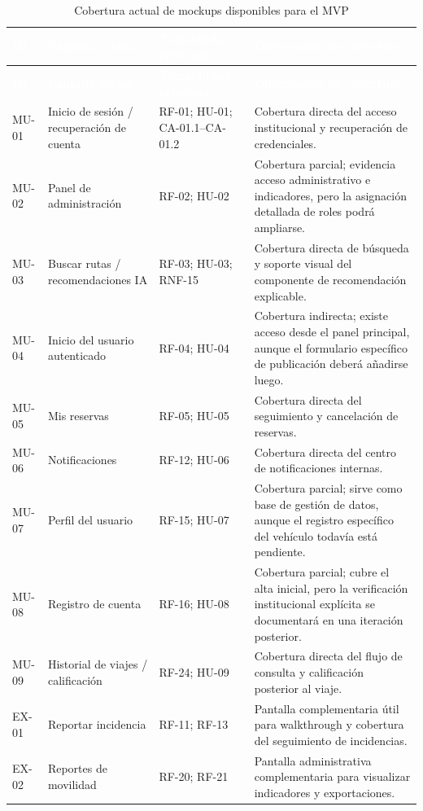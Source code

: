 \documentclass[12pt,a4paper]{article}
\begin{document}
\begin{longtable}{C{1.35cm} L{4.25cm} L{2.45cm} L{5.25cm}}
\caption{Cobertura actual de mockups disponibles para el MVP}\label{tab:cobertura-mockups-actual}\\
\textcolor{white}{\textbf{ID}} &
\textcolor{white}{\textbf{Pantalla actual}} &
\textcolor{white}{\textbf{Trazabilidad principal}} &
\textcolor{white}{\textbf{Observación de cobertura}}\\
\endfirsthead
{}
\textcolor{white}{\textbf{ID}} &
\textcolor{white}{\textbf{Pantalla actual}} &
\textcolor{white}{\textbf{Trazabilidad principal}} &
\textcolor{white}{\textbf{Observación de cobertura}}\\
\endhead
MU-01 & Inicio de sesión / recuperación de cuenta & RF-01; HU-01; CA-01.1--CA-01.2 & Cobertura directa del acceso institucional y recuperación de credenciales.\\
MU-02 & Panel de administración & RF-02; HU-02 & Cobertura parcial; evidencia acceso administrativo e indicadores, pero la asignación detallada de roles podrá ampliarse.\\
MU-03 & Buscar rutas / recomendaciones IA & RF-03; HU-03; RNF-15 & Cobertura directa de búsqueda y soporte visual del componente de recomendación explicable.\\
MU-04 & Inicio del usuario autenticado & RF-04; HU-04 & Cobertura indirecta; existe acceso desde el panel principal, aunque el formulario específico de publicación deberá añadirse luego.\\
MU-05 & Mis reservas & RF-05; HU-05 & Cobertura directa del seguimiento y cancelación de reservas.\\
MU-06 & Notificaciones & RF-12; HU-06 & Cobertura directa del centro de notificaciones internas.\\
MU-07 & Perfil del usuario & RF-15; HU-07 & Cobertura parcial; sirve como base de gestión de datos, aunque el registro específico del vehículo todavía está pendiente.\\
MU-08 & Registro de cuenta & RF-16; HU-08 & Cobertura parcial; cubre el alta inicial, pero la verificación institucional explícita se documentará en una iteración posterior.\\
MU-09 & Historial de viajes / calificación & RF-24; HU-09 & Cobertura directa del flujo de consulta y calificación posterior al viaje.\\
EX-01 & Reportar incidencia & RF-11; RF-13 & Pantalla complementaria útil para walkthrough y cobertura del seguimiento de incidencias.\\
EX-02 & Reportes de movilidad & RF-20; RF-21 & Pantalla administrativa complementaria para visualizar indicadores y exportaciones.\\
\end{longtable}
\end{document}

